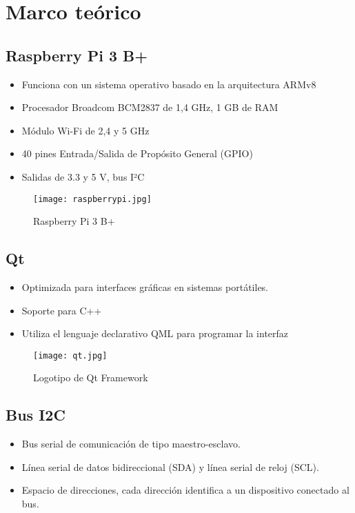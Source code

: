 \section{Marco teórico}

\subsection*{Raspberry Pi 3 B+}
\begin{itemize}
	\item Funciona con un sistema operativo basado en la arquitectura ARMv8
	\item Procesador Broadcom BCM2837 de 1,4 GHz, 1 GB de RAM
	\item Módulo Wi-Fi de 2,4 y 5 GHz
	\item 40 pines Entrada/Salida de Propósito General (GPIO)
	\item Salidas de 3.3 y 5 V, bus I²C
\end{itemize}

\begin{figure}[htb]
	\centering
	\texttt{[image: raspberrypi.jpg]}
	\caption{Raspberry Pi 3 B+}
\end{figure}

\subsection*{Qt}
\begin{itemize}
	\item Optimizada para interfaces gráficas en sistemas portátiles.
	\item Soporte para C++
	\item Utiliza el lenguaje declarativo QML para programar la interfaz
\end{itemize}

\begin{figure}[htb]
	\centering
	\texttt{[image: qt.jpg]}
	\caption{Logotipo de Qt Framework}
\end{figure}

\subsection*{Bus I2C}
\begin{itemize}
	\item Bus serial de comunicación de tipo maestro-esclavo.
	\item Línea serial de datos bidireccional (SDA)  y línea serial de reloj (SCL).
	\item Espacio de direcciones, cada dirección identifica a un dispositivo conectado al bus.
\end{itemize}

